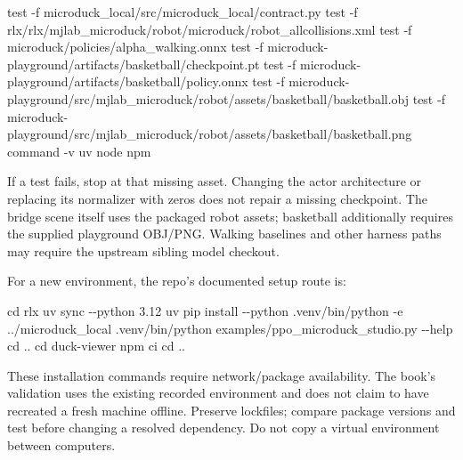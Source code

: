 \documentclass[
  american,
  11pt,
  letterpaper,
]{article}
\newenvironment{Shaded}{\begin{snugshade}}{\end{snugshade}}
\newcommand{\AttributeTok}[1]{\textcolor[rgb]{0.13,0.29,0.53}{#1}}
\newcommand{\BuiltInTok}[1]{#1}
\newcommand{\ExtensionTok}[1]{#1}
\newcommand{\NormalTok}[1]{#1}
\renewenvironment{Shaded}{\par\smallskip}{\par\smallskip}
\begin{document}
\begin{Shaded}
\begin{Highlighting}[]
\BuiltInTok{test} \AttributeTok{{-}f}\NormalTok{ microduck\_local/src/microduck\_local/contract.py}
\BuiltInTok{test} \AttributeTok{{-}f}\NormalTok{ rlx/rlx/mjlab\_microduck/robot/microduck/robot\_allcollisions.xml}
\BuiltInTok{test} \AttributeTok{{-}f}\NormalTok{ microduck/policies/alpha\_walking.onnx}
\BuiltInTok{test} \AttributeTok{{-}f}\NormalTok{ microduck{-}playground/artifacts/basketball/checkpoint.pt}
\BuiltInTok{test} \AttributeTok{{-}f}\NormalTok{ microduck{-}playground/artifacts/basketball/policy.onnx}
\BuiltInTok{test} \AttributeTok{{-}f}\NormalTok{ microduck{-}playground/src/mjlab\_microduck/robot/assets/basketball/basketball.obj}
\BuiltInTok{test} \AttributeTok{{-}f}\NormalTok{ microduck{-}playground/src/mjlab\_microduck/robot/assets/basketball/basketball.png}
\BuiltInTok{command} \AttributeTok{{-}v}\NormalTok{ uv node npm}
\end{Highlighting}
\end{Shaded}

If a test fails, stop at that missing asset. Changing the actor
architecture or replacing its normalizer with zeros does not repair a
missing checkpoint. The bridge scene itself uses the packaged robot
assets; basketball additionally requires the supplied playground
OBJ/PNG. Walking baselines and other harness paths may require the
upstream sibling model checkout.

For a new environment, the repo's documented setup route is:

\begin{Shaded}
\begin{Highlighting}[]
\BuiltInTok{cd}\NormalTok{ rlx}
\ExtensionTok{uv}\NormalTok{ sync }\AttributeTok{{-}{-}python}\NormalTok{ 3.12}
\ExtensionTok{uv}\NormalTok{ pip install }\AttributeTok{{-}{-}python}\NormalTok{ .venv/bin/python }\AttributeTok{{-}e}\NormalTok{ ../microduck\_local}
\ExtensionTok{.venv/bin/python}\NormalTok{ examples/ppo\_microduck\_studio.py }\AttributeTok{{-}{-}help}
\BuiltInTok{cd}\NormalTok{ ..}
\BuiltInTok{cd}\NormalTok{ duck{-}viewer}
\ExtensionTok{npm}\NormalTok{ ci}
\BuiltInTok{cd}\NormalTok{ ..}
\end{Highlighting}
\end{Shaded}

These installation commands require network/package availability. The
book's validation uses the existing recorded environment and does not
claim to have recreated a fresh machine offline. Preserve lockfiles;
compare package versions and test before changing a resolved dependency.
Do not copy a virtual environment between computers.
\end{document}
